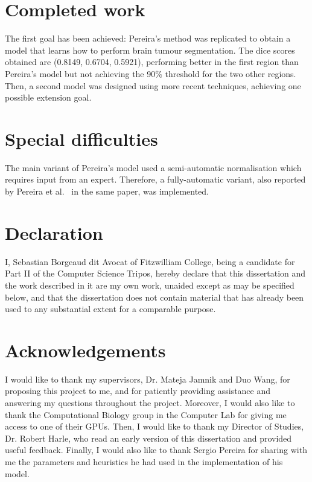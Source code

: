 \documentclass[12pt,a4paper,twoside,openright]{report}
\begin{document}
\section*{Completed work}
The first goal has been achieved: Pereira's method was replicated to obtain a model that learns how to perform brain tumour segmentation. The dice scores obtained are (0.8149, 0.6704, 0.5921), performing better in the first region than Pereira's model but not achieving the 90\% threshold for the two other regions. Then, a second model was designed using more recent techniques, achieving one possible extension goal.

\section*{Special difficulties}
The main variant of Pereira's model used a semi-automatic normalisation which requires input from an expert. Therefore, a fully-automatic variant, also reported by Pereira et al.\ \cite{pereira} in the same paper, was implemented.
\newpage
\section*{Declaration}

I, Sebastian Borgeaud dit Avocat of Fitzwilliam College, being a candidate for Part II of the Computer Science Tripos, hereby declare
that this dissertation and the work described in it are my own work,
unaided except as may be specified below, and that the dissertation
does not contain material that has already been used to any substantial
extent for a comparable purpose.

\bigskip
{}

\medskip
{}

\tableofcontents

{\listoffigures \let\cleardoublepage\clearpage \listoftables}


\newpage

\setlength{\parskip}{1em} %

\section*{Acknowledgements}
I would like to thank my supervisors, Dr. Mateja Jamnik and Duo Wang, for proposing this project to me, and for patiently providing assistance and answering my questions throughout the project. Moreover, I would also like to thank the Computational Biology group in the Computer Lab for giving me access to one of their GPUs. Then, I would like to thank my Director of Studies, Dr. Robert Harle, who read an early version of this dissertation and provided useful feedback. Finally, I would also like to thank Sergio Pereira for sharing with me the parameters and heuristics he had used in the implementation of his model.
\end{document}

